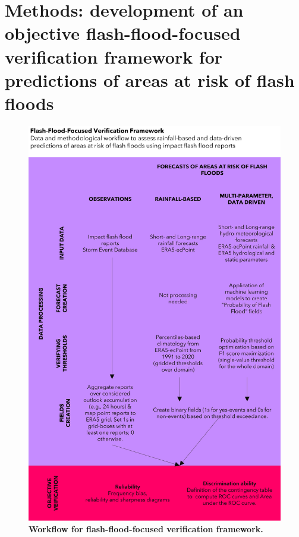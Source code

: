 \section{Methods: development of an objective flash-flood-focused 
verification framework for predictions of areas at risk of flash floods}
\label{flash_flood_focused_verification_rainfall_based_ff_METHODS}

\begin{figure}[htbp]
\centering
\includegraphics[width=\textwidth]{workflow_verif_framework.png}
\caption{\textbf{Workflow for flash-flood-focused verification framework.}}
\label{fig:workflow_verif_framework}
\end{figure}

